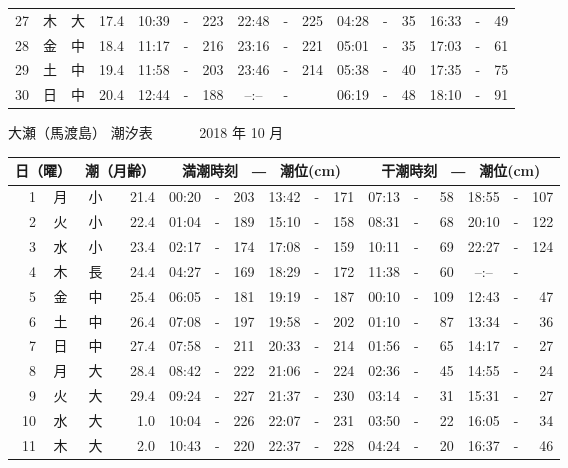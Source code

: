 \documentclass[12pt.a4j]{jsarticle}
\begin{document}
\begin{center}
\begin{table}[ht]
\begin{tabular}{|rc|cr|ccrccr|ccrccr|}
27 & 木 & 大 & 17.4 &  10:39 &-& 223  &  22:48 &-& 225  &   04:28 &-&  35  &   16:33 &-&  49  \\
28 & 金 & 中 & 18.4 &  11:17 &-& 216  &  23:16 &-& 221  &   05:01 &-&  35  &   17:03 &-&  61  \\
29 & 土 & 中 & 19.4 &  11:58 &-& 203  &  23:46 &-& 214  &   05:38 &-&  40  &   17:35 &-&  75  \\
30 & 日 & 中 & 20.4 &  12:44 &-& 188  &  --:-- &-&     &   06:19 &-&  48  &   18:10 &-&  91  \\
   \hline
   \end{tabular}
\end{table}
\newpage
 {\LARGE 大瀬（馬渡島）  潮汐表　　　}
 {\large 2018 年 10 月}\\
 \begin{table}[ht]
    \begin{tabular}{|rc|cr|ccrccr|ccrccr|}
    \hline
    \multicolumn{2}{|c|}{日（曜）} & \multicolumn{2}{c|}{潮（月齢）} & \multicolumn{6}{c|}{満潮時刻　―　潮位(cm)} & \multicolumn{6}{c|}{干潮時刻　―　潮位(cm)} \\
 \hline
 1 & 月 & 小 & 21.4 &  00:20 &-& 203  &  13:42 &-& 171  &   07:13 &-&  58  &   18:55 &-& 107  \\
 2 & 火 & 小 & 22.4 &  01:04 &-& 189  &  15:10 &-& 158  &   08:31 &-&  68  &   20:10 &-& 122  \\
 3 & 水 & 小 & 23.4 &  02:17 &-& 174  &  17:08 &-& 159  &   10:11 &-&  69  &   22:27 &-& 124  \\
 4 & 木 & 長 & 24.4 &  04:27 &-& 169  &  18:29 &-& 172  &   11:38 &-&  60  &   --:-- &-&     \\
 5 & 金 & 中 & 25.4 &  06:05 &-& 181  &  19:19 &-& 187  &   00:10 &-& 109  &   12:43 &-&  47  \\
 6 & 土 & 中 & 26.4 &  07:08 &-& 197  &  19:58 &-& 202  &   01:10 &-&  87  &   13:34 &-&  36  \\
 7 & 日 & 中 & 27.4 &  07:58 &-& 211  &  20:33 &-& 214  &   01:56 &-&  65  &   14:17 &-&  27  \\
 8 & 月 & 大 & 28.4 &  08:42 &-& 222  &  21:06 &-& 224  &   02:36 &-&  45  &   14:55 &-&  24  \\
 9 & 火 & 大 & 29.4 &  09:24 &-& 227  &  21:37 &-& 230  &   03:14 &-&  31  &   15:31 &-&  27  \\
10 & 水 & 大 &  1.0 &  10:04 &-& 226  &  22:07 &-& 231  &   03:50 &-&  22  &   16:05 &-&  34  \\
11 & 木 & 大 &  2.0 &  10:43 &-& 220  &  22:37 &-& 228  &   04:24 &-&  20  &   16:37 &-&  46  \\

\end{tabular}
\end{table}
\end{center}
\end{document}
